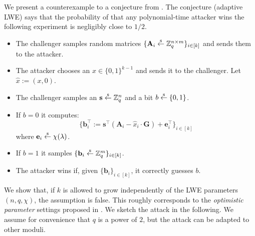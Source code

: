 \documentclass{article}
\newcommand{\getsr}{\overset{\raisebox{-1pt}{$\scriptscriptstyle \$$}}{\gets}}
\newcommand{\sample}{\getsr}
\newcommand{\Z}{\mathbb{Z}}
\begin{document}
We present a counterexample to a conjecture from \cite{FOCS:QuaWeeWic18}. The conjecture (adaptive LWE) says that the probability of that any polynomial-time attacker wins the following experiment is negligibly close to $1/2$.
\begin{itemize}
    \item The challenger samples random matrices $\{\mathbf{A}_i \sample \Z_q^{n\times m} \}_{i\in[k]}$ and sends them to the attacker.
    \item The attacker chooses an $x\in\{0,1\}^{k-1}$ and sends it to the challenger. Let $\hat{x} := (x, 0)$.
    \item The challenger samples an $\mathbf{s}\sample\Z_q^n$ and a bit $b\sample\{0,1\}$.
    \item If $b =0$ it computes:
    \[
    \{\mathbf{b}_i^\intercal := \mathbf{s}^\intercal(\mathbf{A}_i - \hat{x}_i\cdot \mathbf{G}) + \mathbf{e}_i^\intercal\}_{i\in[k]}
    \]
    where $\mathbf{e}_i \sample \chi(\lambda)$.
    \item If $b =1$ it samples $\{\mathbf{b}_i \sample \Z_q^m\}_{i\in[k]}$.
    \item The attacker wins if, given $\{\mathbf{b}_i\}_{i\in[k]}$, it correctly guesses $b$.
\end{itemize}
We show that, if $k$ is allowed to grow independently of the LWE parameters $(n,q,\chi)$, the assumption is false. This roughly corresponds to the \emph{optimistic parameter} settings proposed in \cite{FOCS:QuaWeeWic18}. We sketch the attack in the following. We assume for convenience that $q$ is a power of $2$, but the attack can be adapted to other moduli.
\end{document}

